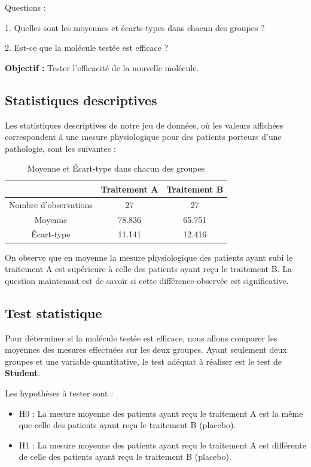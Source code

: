\documentclass[12pt,a4paper]{article}
\begin{document}
	Questions :
	
	1. Quelles sont les moyennes et écarts-types dans chacun des groupes ?
	
	2. Est-ce que la molécule testée est efficace ?
	
	\textbf{Objectif :} Tester l'efficacité de la nouvelle molécule.
	
	\subsection{Statistiques descriptives}
	Les statistiques descriptives de notre jeu de données, où les valeurs affichées correspondent à une mesure physiologique pour des patients porteurs d'une pathologie, sont les suivantes :
	
	\begin{table}[H]
		\centering
		\begin{tabular}{ccc}
			\toprule
			& Traitement A & Traitement B \\
			\midrule
			Nombre d'observations & 27 & 27 \\
			Moyenne & 78.836 & 65.751 \\
			Écart-type & 11.141 & 12.416 \\
			\bottomrule
		\end{tabular}
		\caption{Moyenne et Écart-type dans chacun des groupes}
		\label{tab:example}
	\end{table}
	
	On observe que en moyenne la mesure physiologique des patients ayant subi le traitement A est supérieure à celle des patients ayant reçu le traitement B. La question maintenant est de savoir si cette différence observée est significative.
	
	\subsection{Test statistique}
	Pour déterminer si la molécule testée est efficace, nous allons comparer les moyennes des mesures effectuées sur les deux groupes. Ayant seulement deux groupes et une variable quantitative, le test adéquat à réaliser est le test de \textbf{Student}.
	
	Les hypothèses à tester sont :
	\begin{itemize}
		\item H0 : La mesure moyenne des patients ayant reçu le traitement A est la même que celle des patients ayant reçu le traitement B (placebo).
		\item H1 : La mesure moyenne des patients ayant reçu le traitement A est différente de celle des patients ayant reçu le traitement B (placebo).
	\end{itemize}
	
\end{document}
